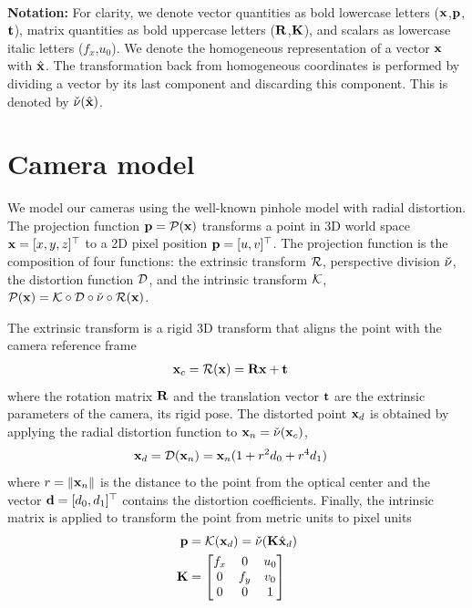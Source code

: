 \documentclass[10pt,twocolumn,letterpaper]{article}
\begin{document}
~\\ \noindent\textbf{Notation:}
For clarity, we denote vector quantities as bold lowercase letters (\eg $\mathbf{x}$,$\mathbf{p}$,$\mathbf{t}$), matrix quantities as bold uppercase letters (\eg $\mathbf{R}$,$\mathbf{K}$), and scalars as lowercase italic letters (\eg $f_x$,$u_0$). We denote the homogeneous representation of a vector $\mathbf{x}$ with $\hat{\mathbf{x}}$. The transformation back from homogeneous coordinates is performed by dividing a vector by its last component and discarding this component. This is denoted by $\check{\nu}(\hat{\mathbf{x}})$. 

\section{Camera model}

We model our cameras using the well-known pinhole model with radial distortion. The projection function $\mathbf{p}=\mathcal{P}(\mathbf{x})$ transforms a point in 3D world space $\mathbf{x}=[x,y,z]^\top$ to a 2D pixel position $\mathbf{p}=[u,v]^\top$. The projection function is the composition of four functions: the extrinsic transform $\mathcal{R}$, perspective division $\check{\nu}$, the distortion function $\mathcal{D}$, and the intrinsic transform $\mathcal{K}$, \ie $\mathcal{P}(\mathbf{x}) = \mathcal{K} \circ \mathcal{D} \circ \check{\nu} \circ \mathcal{R}(\mathbf{x})$.

The extrinsic transform is a rigid 3D transform that aligns the point with the camera reference frame
%
\begin{align}
\mathbf{x}_c &= \mathcal{R}(\mathbf{x}) = \mathbf{R} \mathbf{x} + \mathbf{t} 
\end{align}
%
where the rotation matrix $\mathbf{R}$ and the translation vector $\mathbf{t}$ are the extrinsic parameters of the camera, \ie its rigid pose. The distorted point $\mathbf{x}_d$ is obtained by applying the radial distortion function to $\mathbf{x}_n = \check{\nu}(\mathbf{x}_c)$, \ie
%
\begin{align}
\mathbf{x}_d = \mathcal{D}(\mathbf{x}_n) &= \mathbf{x}_n (1+r^2 d_0 + r^4 d_1)
\label{eq:distortion}
\end{align}
%
where $r = \lVert\mathbf{x}_n\rVert$ is the distance to the point from the optical center and the vector $\mathbf{d}=[d_0,d_1]^\top$ contains the distortion coefficients. Finally, the intrinsic matrix is applied to transform the point from metric units to pixel units
%
\begin{align}
\mathbf{p} &= \mathcal{K}(\mathbf{x}_d) = \check{\nu}(\mathbf{K} \hat{\mathbf{x}}_d)
\\
\mathbf{K} &= \begin{bmatrix}
f_x & 0 & u_0 \\
0 & f_y & v_0 \\
0 & 0 & 1
\end{bmatrix}
\label{eq:intrinsic_matrix}
\end{align}
%
\end{document}
